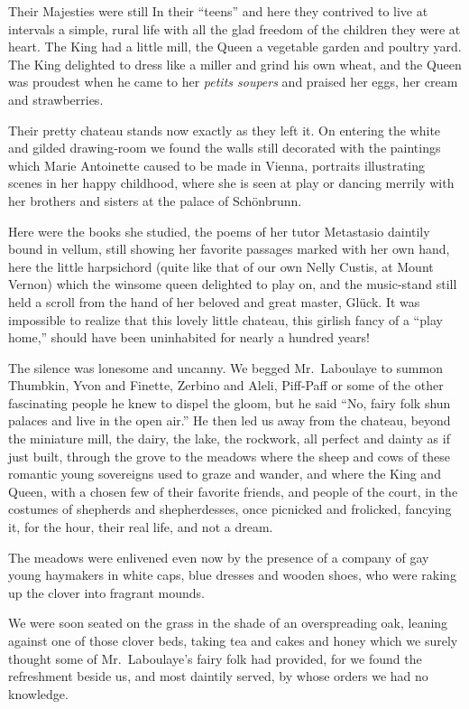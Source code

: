 \documentclass[12pt]{book}
\begin{document}
Their Majesties were still In their “teens” and here they contrived to live at
intervals a simple, rural life with all the glad freedom of the children they were at
heart. The King had a little mill, the Queen a vegetable garden and poultry yard.
The King delighted to dress like a miller and grind his own wheat, and the Queen
was proudest when he came to her {\it petits soupers} and praised her eggs, her cream
and strawberries.

Their pretty chateau stands now exactly as they left it. On entering the white
and gilded drawing‐room we found the walls still decorated with the paintings
which Marie Antoinette caused to be made in Vienna, portraits illustrating scenes
in her happy childhood, where she is seen at play or dancing merrily with her
brothers and sisters at the palace of Schönbrunn.

Here were the books she studied, the poems of her tutor Metastasio daintily
bound in vellum, still showing her favorite passages marked with her own hand,
here the little harpsichord (quite like that of our own Nelly Custis, at Mount
Vernon) which the winsome queen delighted to play on, and the music‐stand
still held a scroll from the hand of her beloved and great master, Glück. It was
impossible to realize that this lovely little chateau, this girlish fancy of a “play
home,” should have been uninhabited for nearly a hundred years!

The silence was lonesome and uncanny. We begged Mr.~Laboulaye to summon
Thumbkin, Yvon and Finette, Zerbino and Aleli, Piff‐Paff or some of the other
fascinating people he knew to dispel the gloom, but he said “No, fairy folk shun
palaces and live in the open air.” He then led us away from the chateau, beyond
the miniature mill, the dairy, the lake, the rockwork, all perfect and dainty as if
just built, through the grove to the meadows where the sheep and cows of these
romantic young sovereigns used to graze and wander, and where the King and
Queen, with a chosen few of their favorite friends, and people of the court, in the
costumes of shepherds and shepherdesses, once picnicked and frolicked, fancying
it, for the hour, their real life, and not a dream.

The meadows were enlivened even now by the presence of a company of gay
young haymakers in white caps, blue dresses and wooden shoes, who were raking
up the clover into fragrant mounds.

We were soon seated on the grass in the shade of an overspreading oak,
leaning against one of those clover beds, taking tea and cakes and honey which
we surely thought some of Mr.~Laboulaye’s fairy folk had provided, for we found
the refreshment beside us, and most daintily served, by whose orders we had no
knowledge.
\end{document}
